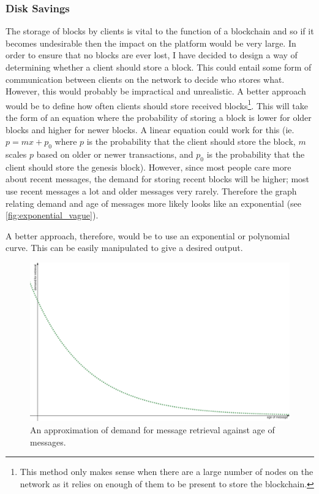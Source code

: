 \documentclass{article}
\begin{document}
\subsubsection{Disk Savings}
The storage of blocks by clients is vital to the function of a blockchain and so if it becomes undesirable then the impact on the platform would be very large. In order to ensure that no blocks are ever lost, I have decided to design a way of determining whether a client should store a block. This could entail some form of communication between clients on the network to decide who stores what. However, this would probably be impractical and unrealistic. A better approach would be to define how often clients should store received blocks\footnote{This method only makes sense when there are a large number of nodes on the network as it relies on enough of them to be present to store the blockchain.}. This will take the form of an equation where the probability of storing a block is lower for older blocks and higher for newer blocks. A linear equation could work for this (ie. $p = mx + p_0$ where $p$ is the probability that the client should store the block, $m$ scales $p$ based on older or newer transactions, and $p_0$ is the probability that the client should store the genesis block). However, since most people care more about recent messages, the demand for storing recent blocks will be higher; most use recent messages a lot and older messages very rarely. Therefore the graph relating demand and age of messages more likely looks like an exponential (see \autoref{fig:exponential_vague}).

A better approach, therefore, would be to use an exponential or polynomial curve. This can be easily manipulated to give a desired output.
\begin{figure}[h]
    \centering
    \includegraphics[width=0.7\linewidth]{Images/exponential.PNG}
    \caption{An approximation of demand for message retrieval against age of messages.}
    \label{fig:exponential_vague}
\end{figure}
\end{document}
